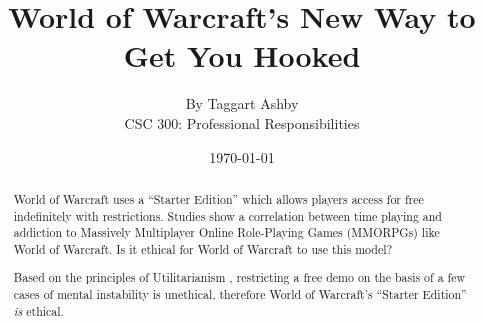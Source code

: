 \documentclass[11pt]{article}
\begin{document}


\title{\vfill World of Warcraft's New Way to Get You Hooked} %
\author{
By Taggart Ashby \vspace{10pt} \\
CSC 300: Professional Responsibilities  \vspace{10pt} \\
}
\date{\today} %

\maketitle


\vfill  %
\begin{abstract}
World of Warcraft uses a ``Starter Edition'' which allows players access for free indefinitely with restrictions. \cite{starterEditionNewsRelease} Studies show a correlation between time playing and addiction to Massively Multiplayer Online Role-Playing Games (MMORPGs) like World of Warcraft. \cite{ProblemUsageAmongHighlyEngagedPlayers}\cite{JustAComputerGameRight} Is it ethical for World of Warcraft to use this model?

Based on the principles of Utilitarianism \cite{Utilitarianism}, restricting a free demo on the basis of a few cases of mental instability is unethical, therefore World of Warcraft's ``Starter Edition'' \emph{is} ethical.
\end{abstract}

\thispagestyle{empty} %
\newpage


\thispagestyle{empty}  %
\tableofcontents
\end{document}

